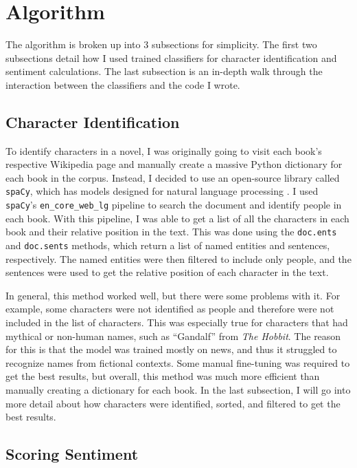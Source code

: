 \documentclass[stu,12pt,floatsintext]{apa7}
\newcommand{\code}[1]{\colorbox{light-gray}{\texttt{#1}}}
\begin{document}
\section{Algorithm}

The algorithm is broken up into 3 subsections for simplicity. The first two subsections detail how I used trained classifiers for character identification and sentiment calculations. The last subsection is an in-depth walk through the interaction between the classifiers and the code I wrote. 

\subsection{Character Identification}

To identify characters in a novel, I was originally going to visit each book's respective Wikipedia page and manually create a massive Python dictionary for each book in the corpus. Instead, I decided to use an open-source library called \code{spaCy}, which has models designed for natural language processing \parencite{spacy}. I used \code{spaCy}'s \code{en\_core\_web\_lg} pipeline to search the document and identify people in each book. With this pipeline, I was able to get a list of all the characters in each book and their relative position in the text. This was done using the \code{doc.ents} and \code{doc.sents} methods, which return a list of named entities and sentences, respectively. The named entities were then filtered to include only people, and the sentences were used to get the relative position of each character in the text. 

In general, this method worked well, but there were some problems with it. For example, some characters were not identified as people and therefore were not included in the list of characters. This was especially true for characters that had mythical or non-human names, such as ``Gandalf'' from \textit{The Hobbit}. The reason for this is that the model was trained mostly on news, and thus it struggled to recognize names from fictional contexts. Some manual fine-tuning was required to get the best results, but overall, this method was much more efficient than manually creating a dictionary for each book. In the last subsection, I will go into more detail about how characters were identified, sorted, and filtered to get the best results.

\subsection{Scoring Sentiment}
\end{document}

